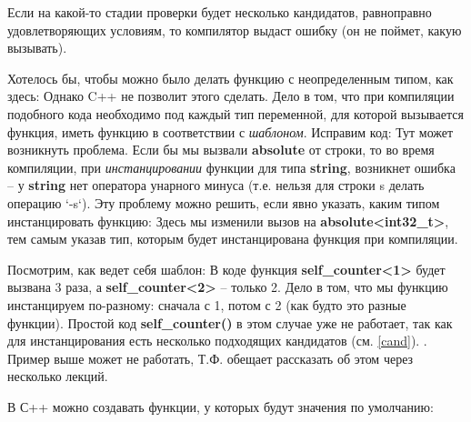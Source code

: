 \begin{lecture}[\lectureSubject]
\begin{lecSection}
		Если на какой-то стадии проверки будет несколько кандидатов, равноправно удовлетворяющих условиям, то компилятор выдаст ошибку (он не поймет, какую вызывать).
	\end{lecSection}
	\begin{lecSection}[Шаблоны]
		Хотелось бы, чтобы можно было делать функцию с неопределенным типом, как здесь: \newpage
		Однако C++ не позволит этого сделать. Дело в том, что при компиляции подобного кода необходимо под каждый тип переменной, для которой вызывается функция, иметь функцию в соответствии с \textit{шаблоном}. Исправим код:
		Тут может возникнуть проблема. Если бы мы вызвали \textbf{absolute} от строки, то во время компиляции, при \textit{инстанцировании} функции для типа \textbf{string}, возникнет ошибка -- у \textbf{string} нет оператора унарного минуса (т.е. нельзя для строки s делать операцию `-s`). Эту проблему можно решить, если явно указать, каким типом инстанцировать функцию:
		Здесь мы изменили вызов на \textbf{absolute<int32\_t>}, тем самым указав тип, которым будет инстанцирована функция при компиляции.
		
		Посмотрим, как ведет себя шаблон:
		В коде функция \textbf{self\_counter<1>} будет вызвана 3 раза, а \textbf{self\_counter<2>} -- только 2. Дело в том, что мы функцию инстанцируем по-разному: сначала с 1, потом с 2 (как будто это разные функции). Простой код \textbf{self\_counter()} в этом случае уже не работает, так как для инстанцирования есть несколько подходящих кандидатов (см. \ref{cand}).
		.
		Пример выше может не работать, Т.Ф. обещает рассказать об этом через несколько лекций.
	\end{lecSection}
	\begin{lecSection}
		В С++ можно создавать функции, у которых будут значения по умолчанию:
		

\end{lecSection}
\end{lecture}
